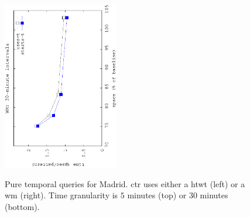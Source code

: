 \begin{figure}[!ht]
\begin{center}
\begin{center}
				{\includegraphics[angle=-90,width=0.45\textwidth]{figures_synt/madrid_t30mwm.eps}}
			\end{center}
		\end{center}
		\vspace{-0.5cm}
		\caption{Pure temporal queries for Madrid. \acrshort{ctr} uses either a \acrlong{htwt} (left) or a \acrlong{wm} (right). 
			Time granularity is $5$ minutes (top) or $30$ minutes (bottom).}
		\label{fig:madridst_topk}
		\vspace{-0.3cm}





\end{figure}
